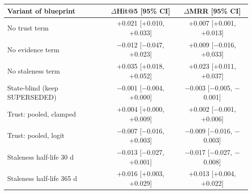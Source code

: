 \begin{tabular}{lcc}
\toprule
Variant of blueprint \sys{} & $\Delta$Hit@5 [95\% CI] & $\Delta$MRR [95\% CI] \\
\midrule
No trust term & +0.021 [+0.010, +0.033] & +0.007 [+0.001, +0.013] \\
No evidence term & $-$0.012 [$-$0.047, +0.023] & +0.009 [$-$0.016, +0.033] \\
No staleness term & +0.035 [+0.018, +0.052] & +0.023 [+0.011, +0.037] \\
State-blind (keep SUPERSEDED) & $-$0.001 [$-$0.004, +0.000] & $-$0.003 [$-$0.005, $-$0.001] \\
Trust: pooled, clamped & +0.004 [+0.000, +0.009] & +0.002 [$-$0.001, +0.006] \\
Trust: pooled, logit & $-$0.007 [$-$0.016, +0.003] & $-$0.009 [$-$0.016, $-$0.003] \\
Staleness half-life 30 d & $-$0.013 [$-$0.027, +0.001] & $-$0.017 [$-$0.027, $-$0.008] \\
Staleness half-life 365 d & +0.016 [+0.003, +0.029] & +0.013 [+0.004, +0.022] \\
\bottomrule
\end{tabular}